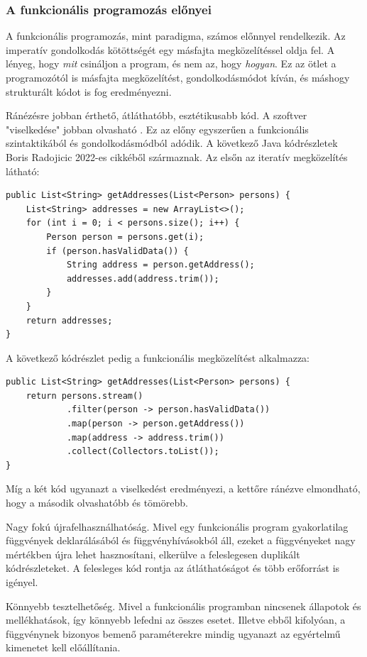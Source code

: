 \documentclass[12pt]{article}
\begin{document}
\subsubsection{A funkcionális programozás előnyei}
A funkcionális programozás, mint paradigma, számos előnnyel rendelkezik. Az imperatív gondolkodás kötöttségét egy másfajta megközelítéssel oldja fel. A lényeg, hogy \textit{mit} csináljon a program, és nem az, hogy \textit{hogyan}. Ez az ötlet a programozótól is  másfajta megközelítést, gondolkodásmódot kíván, és máshogy strukturált kódot is fog eredményezni. 

Ránézésre jobban érthető, átláthatóbb, esztétikusabb kód. A szoftver "viselkedése" jobban olvasható \cite{CS}. Ez az előny egyszerűen a funkcionális szintaktikából és gondolkodásmódból adódik. A következő Java kódrészletek Boris Radojicic 2022-es cikkéből \cite{sy} származnak. Az elsőn az iteratív megközelítés látható:

\begin{verbatim}
public List<String> getAddresses(List<Person> persons) {
    List<String> addresses = new ArrayList<>();
    for (int i = 0; i < persons.size(); i++) {
        Person person = persons.get(i);
        if (person.hasValidData()) {
            String address = person.getAddress();
            addresses.add(address.trim());
        }
    }
    return addresses;
}
\end{verbatim}
A következő kódrészlet pedig a funkcionális megközelítést alkalmazza:
\begin{verbatim}
public List<String> getAddresses(List<Person> persons) {
    return persons.stream()
            .filter(person -> person.hasValidData())
            .map(person -> person.getAddress())
            .map(address -> address.trim())
            .collect(Collectors.toList());
}
\end{verbatim}
Míg a két kód ugyanazt a viselkedést eredményezi, a kettőre ránézve elmondható, hogy a második olvashatóbb és tömörebb.

Nagy fokú újrafelhasználhatóság. Mivel egy funkcionális program gyakorlatilag függvények deklarálásából és függvényhívásokból áll, ezeket a függvényeket nagy mértékben újra lehet hasznosítani, elkerülve a feleslegesen duplikált kódrészleteket. A felesleges kód rontja az átláthatóságot és több erőforrást is igényel.

Könnyebb tesztelhetőség. Mivel a funkcionális programban nincsenek állapotok és mellékhatások, így könnyebb lefedni az összes esetet. Illetve ebből kifolyóan, a függvénynek bizonyos bemenő paraméterekre mindig ugyanazt az egyértelmű kimenetet kell előállítania.
\end{document}
